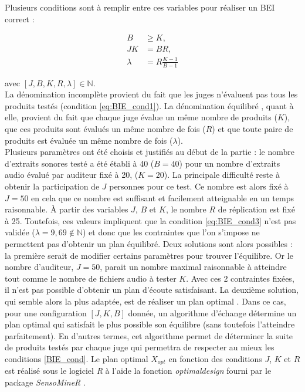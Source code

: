 {Plusieurs conditions sont à remplir entre ces variables pour réaliser un BEI correct :

\begin{subequations}\label{BIE_cond}
\begin{align}
B &\geq K, \label{eq:BIE_cond1}\\
JK &= BR, \label{eq:BIE_cond2}\\
\lambda &= R\frac{K-1}{B-1} \label{eq:BIE_cond3}
\end{align}
\end{subequations}

avec $\left[J, B, K, R, \lambda\right] \in \mathbb{N}$.\\

La dénomination \og incomplète \fg{} provient du fait que les juges n'évaluent pas tous les produits testés (condition \ref{eq:BIE_cond1}). La dénomination \og équilibré \fg{}, quant à elle, provient du fait que chaque juge évalue un même nombre de produits ($K$), que ces produits sont évalués un même nombre de fois ($R$) et que toute paire de produits est évaluée un même nombre de fois ($\lambda$). \\

Plusieurs paramètres ont été choisis et justifiés au début de la partie : le nombre d'extraits sonores testé a été établi à 40 ($B = 40$) pour un nombre d'extraits audio évalué par auditeur fixé à 20, ($K = 20$). La principale difficulté reste à obtenir la participation de $J$ personnes pour ce test. Ce nombre est alors fixé à $J = 50$ en cela que ce nombre est suffisant et facilement atteignable en un temps raisonnable. À partir des variables $J$, $B$ et $K$, le nombre $R$ de réplication est fixé à 25. Toutefois, ces valeurs impliquent que la condition \ref{eq:BIE_cond3} n'est pas validée ($\lambda = 9,69 \notin \mathbb{N}$) et donc que les contraintes que l'on s'impose ne permettent pas d'obtenir un plan équilibré. Deux solutions sont alors possibles : la première serait de modifier certains paramètres pour trouver l'équilibre. Or le nombre d'auditeur, $J = 50$, parait un nombre maximal raisonnable à atteindre tout comme le nombre de fichiers audio à tester $K$. Avec ces 2 contraintes fixées, il n'est pas possible d'obtenir un plan d'écoute satisfaisant. La deuxième solution, qui semble alors la plus adaptée, est de réaliser un plan optimal \cite{pages_blocs_2007}. Dans ce cas, pour une configuration $\left[J, K, B\right]$ donnée, un algorithme d'échange détermine un \og plan optimal \fg{} qui satisfait le plus possible son équilibre (sans toutefois l'atteindre parfaitement). En d'autres termes, cet algorithme permet de déterminer la suite de produits testés par chaque juge qui permettra de respecter au mieux les conditions \ref{BIE_cond}.
Le plan optimal $X_{opt}$ en fonction des conditions $J$, $K$ et $R$ est réalisé sous le logiciel \textit{R} à l'aide la fonction \textit{optimaldesign} fourni par le package \textit{SensoMineR} \cite{le_sensominer_2008}.


}
